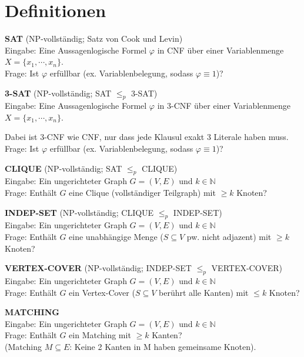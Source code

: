 \documentclass[a4paper,graphics,11pt]{article}
\begin{document}
\newpage

\section*{Definitionen}

\textbf{SAT} (\textsf{NP}-vollständig; Satz von Cook und Levin)
\\[5pt]
Eingabe: Eine Aussagenlogische Formel $\varphi$ in CNF über einer Variablenmenge $X = \{x_1,\cdots,x_n\}$.
\\[5pt]
Frage: Ist $\varphi$ erfüllbar (ex. Variablenbelegung, sodass $\varphi \equiv 1$)?

\strut

\textbf{3-SAT} (\textsf{NP}-vollständig; SAT $\leq_p$ 3-SAT)
\\[5pt]
Eingabe: Eine Aussagenlogische Formel $\varphi$ in 3-CNF über einer Variablenmenge $X = \{x_1,\cdots,x_n\}$.\\
\strut\qquad Dabei ist 3-CNF wie CNF, nur dass jede Klausul exakt 3 Literale haben muss.
\\[5pt]
Frage: Ist $\varphi$ erfüllbar (ex. Variablenbelegung, sodass $\varphi \equiv 1$)?

\strut

\textbf{CLIQUE} (\textsf{NP}-vollständig; SAT $\leq_p$ CLIQUE)
\\[5pt]
Eingabe: Ein ungerichteter Graph $G = (V,E)$ und $k \in \mathbb{N}$
\\[5pt]
Frage: Enthält $G$ eine Clique (vollständiger Teilgraph) mit $\geq k$ Knoten?

\strut

\textbf{INDEP-SET} (\textsf{NP}-vollständig; CLIQUE $\leq_p$ INDEP-SET)
\\[5pt]
Eingabe: Ein ungerichteter Graph $G = (V,E)$ und $k \in \mathbb{N}$
\\[5pt]
Frage: Enthält $G$ eine unabhängige Menge ($S \subseteq V$ pw. nicht adjazent) mit $\geq k$ Knoten?

\strut

\textbf{VERTEX-COVER} (\textsf{NP}-vollständig; INDEP-SET $\leq_p$ VERTEX-COVER)
\\[5pt]
Eingabe: Ein ungerichteter Graph $G = (V,E)$ und $k \in \mathbb{N}$
\\[5pt]
Frage: Enthält $G$ ein Vertex-Cover ($S \subseteq V$ berührt alle Kanten) mit $\leq k$ Knoten?

\strut

\textbf{MATCHING}
\\[5pt]
Eingabe: Ein ungerichteter Graph $G = (V,E)$ und $k \in \mathbb{N}$
\\[5pt]
Frage: Enthält $G$ ein Matching mit $\geq k$ Kanten?\\[5pt]
(Matching $M \subseteq E$: Keine 2 Kanten in M haben gemeinsame Knoten).
\end{document}
